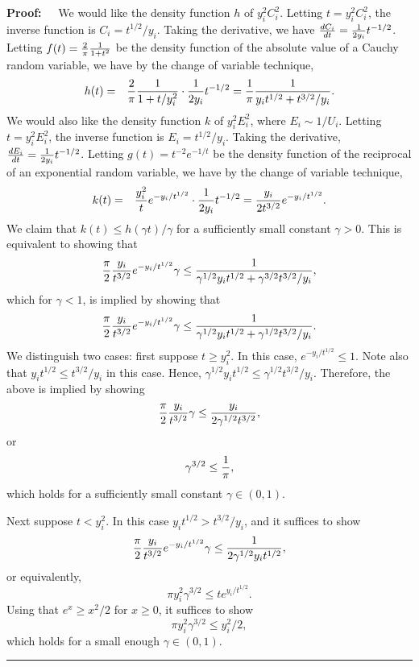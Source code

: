 \documentclass[11pt]{article}
\newenvironment{proof}{\begin{trivlist} \item {\bf Proof:~~}}
  {\qed\end{trivlist}}
\def\frac#1#2{{#1\over #2}}
\def\qed{\hfill\rule{2mm}{2mm}}
\begin{document}
\begin{proof}
We would like the density function $h$ of $y_i^2 C_i^2$. Letting $t = y_i^2 C_i^2$, the inverse function is $C_i = t^{1/2}/y_i$. Taking the derivative,
we have $\frac{dC_i}{dt} = \frac{1}{2y_i} t^{-1/2}$. Letting $f(t) = \frac{2}{\pi} \frac{1}{1+t^2}$ be the density function of the absolute value of a Cauchy random variable,
we have by the change of variable technique,
\begin{eqnarray*}
h(t) & = & \frac{2}{\pi} \frac{1}{1+t/y_i^2} \cdot \frac{1}{2y_i} t^{-1/2} = \frac{1}{\pi} \frac{1}{y_i t^{1/2}+t^{3/2}/y_i}. 
\end{eqnarray*}
We would also like the density function $k$ of $y_i^2 E_i^2$, where $E_i \sim 1/U_i$. Letting $t = y_i^2 E_i^2$, the inverse function is $E_i = t^{1/2}/y_i$. Taking
the derivative, $\frac{dE_i}{dt} = \frac{1}{2y_i} t^{-1/2}$. Letting $g(t) = t^{-2} e^{-1/t}$ be the density function of the reciprocal of an exponential random variable,
we have by the change of variable technique,
\begin{eqnarray*}
k(t) & = & \frac{y_i^2}{t} e^{-y_i/t^{1/2}} \cdot \frac{1}{2y_i} t^{-1/2} = \frac{y_i}{2t^{3/2}} e^{-y_i/t^{1/2}}.
\end{eqnarray*}
We claim that $k(t) \leq h(\gamma t)/\gamma$ for a sufficiently small constant $\gamma > 0$. This is equivalent to showing that
$$\frac{\pi}{2} \frac{y_i}{t^{3/2}} e^{-y_i/t^{1/2}} \gamma \leq \frac{1}{\gamma^{1/2} y_i t^{1/2} + \gamma^{3/2} t^{3/2} / y_i},$$
which for $\gamma < 1$, is implied by showing that
$$\frac{\pi}{2} \frac{y_i}{t^{3/2}} e^{-y_i/t^{1/2}} \gamma \leq \frac{1}{\gamma^{1/2} y_i t^{1/2} + \gamma^{1/2} t^{3/2} / y_i}.$$
We distinguish two cases: first suppose $t \geq y_i^2$. In this case, $e^{-y_i/t^{1/2}} \leq 1$. Note also that 
$y_i t^{1/2} \leq t^{3/2}/y_i$ in this case. Hence,
$\gamma^{1/2} y_i t^{1/2} \leq \gamma^{1/2} t^{3/2}/y_i$. Therefore, the above is implied by showing
$$\frac{\pi}{2} \frac{y_i}{t^{3/2}} \gamma \leq \frac{y_i}{2\gamma^{1/2} t^{3/2}},$$
or 
$$\gamma^{3/2} \leq \frac{1}{\pi},$$
which holds for a sufficiently small constant $\gamma \in (0,1)$. 

Next suppose $t < y_i^2$. In this case $y_i t^{1/2} > t^{3/2}/y_i$, and it suffices to show
$$\frac{\pi}{2} \frac{y_i}{t^{3/2}} e^{-y_i/t^{1/2}} \gamma \leq \frac{1}{2\gamma^{1/2} y_i t^{1/2}},$$
or equivalently,
$$\pi y_i^2 \gamma^{3/2} \leq t e^{y_i/t^{1/2}}.$$
Using that $e^x \geq x^2/2$ for $x \geq 0$, it suffices to show
$$\pi y_i^2 \gamma^{3/2} \leq y_i^2/2,$$
which holds for a small enough $\gamma \in (0,1)$. 


\end{proof}
\end{document}
